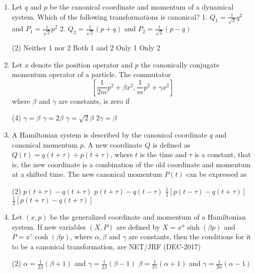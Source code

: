 \begin{enumerate}
	\item  Let $q$ and $p$ be the canonical coordinate and momentum of a dynamical system. Which of the following transformations is canonical?
	1. $Q_{1}=\frac{1}{\sqrt{2}} q^{2}$ and $P_{1}=\frac{1}{\sqrt{2}} p^{2}$
	2. $Q_{2}=\frac{1}{\sqrt{2}}(p+q)$ and $P_{2}=\frac{1}{\sqrt{2}}(p-q)$
	{}
	 \begin{tasks}(2)
		\task[\textbf{a.}]Neither 1 nor 2
		\task[\textbf{b.}]Both 1 and 2
		\task[\textbf{c.}]Only 1
		\task[\textbf{d.}] Only 2
	\end{tasks}
	\item  Let $x$ denote the position operator and $p$ the canonically conjugate momentum operator of a particle. The commutator
	$$
	\left[\frac{1}{2 m} p^{2}+\beta x^{2}, \frac{1}{m} p^{2}+\gamma x^{2}\right]
	$$
	where $\beta$ and $\gamma$ are constants, is zero if
	{}
	 \begin{tasks}(4)
		\task[\textbf{a.}]$\gamma=\beta$
		\task[\textbf{b.}]$\gamma=2 \beta$
		\task[\textbf{c.}]$\gamma=\sqrt{2} \beta$
		\task[\textbf{d.}] $2 \gamma=\beta$
	\end{tasks}
	\item  A Hamiltonian system is described by the canonical coordinate $q$ and canonical momentum $p$. A new coordinate $Q$ is defined as $Q(t)=q(t+\tau)+p(t+\tau)$, where $t$ is the time and $\tau$ is a constant, that is, the new coordinate is a combination of the old coordinate and momentum at a shifted time. The new canonical momentum $P(t)$ can be expressed as
{}
	 \begin{tasks}(2)
		\task[\textbf{a.}]$p(t+\tau)-q(t+\tau)$
		\task[\textbf{b.}]$p(t+\tau)-q(t-\tau)$
		\task[\textbf{c.}]$\frac{1}{2}[p(t-\tau)-q(t+\tau)]$
		\task[\textbf{d.}] $\frac{1}{2}[p(t+\tau)-q(t+\tau)]$
	\end{tasks}
	\item  Let $(x, p)$ be the generalized coordinate and momentum of a Hamiltonian system. If new variables $(X, P)$ are defined by $X=x^{\alpha} \sinh (\beta p)$ and $P=x^{\gamma} \cosh (\beta p)$, where $\alpha, \beta$ and $\gamma$ are constants, then the conditions for it to be a canonical transformation, are
	NET/JRF (DEC-2017)
	 \begin{tasks}(2)
		\task[\textbf{a.}]$\alpha=\frac{1}{2 \beta}(\beta+1)$ and $\gamma=\frac{1}{2 \beta}(\beta-1)$
		\task[\textbf{b.}]$\beta=\frac{1}{2 \gamma}(\alpha+1)$ and $\gamma=\frac{1}{2 \alpha}(\alpha-1)$

\end{tasks}
\end{enumerate}
